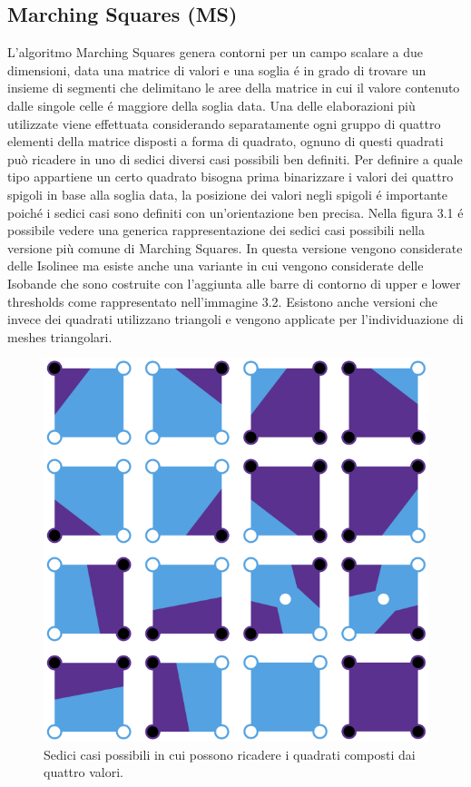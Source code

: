 \documentclass[12pt,a4paper]{report}
\begin{document}
\subsection{Marching Squares (MS)} %
L'algoritmo Marching Squares genera contorni per un campo scalare a due dimensioni, data una matrice di valori e una soglia é in grado di trovare un insieme di segmenti che delimitano le aree della matrice in cui il valore contenuto dalle singole celle é maggiore della soglia data. \newline
Una delle elaborazioni più utilizzate viene effettuata considerando separatamente ogni gruppo di quattro elementi della matrice disposti a forma di quadrato, ognuno di questi quadrati può ricadere in uno di sedici diversi casi possibili ben definiti. Per definire a quale tipo appartiene un certo quadrato bisogna prima binarizzare i valori dei quattro spigoli in base alla soglia data, la posizione dei valori negli spigoli é importante poiché i sedici casi sono definiti con un'orientazione ben precisa. Nella figura 3.1 é possibile vedere una generica rappresentazione dei sedici casi possibili nella versione più comune di Marching Squares.
In questa versione vengono considerate delle Isolinee ma esiste anche una variante in cui vengono considerate delle Isobande che sono costruite con l'aggiunta alle barre di contorno di upper e lower thresholds come rappresentato nell'immagine 3.2. \newline Esistono anche versioni che invece dei quadrati utilizzano triangoli e vengono applicate per l'individuazione di meshes triangolari.
\begin{figure}[H]
    \centering
    \includegraphics[scale=0.32]{img/Marching_squares_isolines.svg.png}
    \caption{Sedici casi possibili in cui possono ricadere i quadrati composti dai quattro valori.}
\end{figure}
\end{document}
